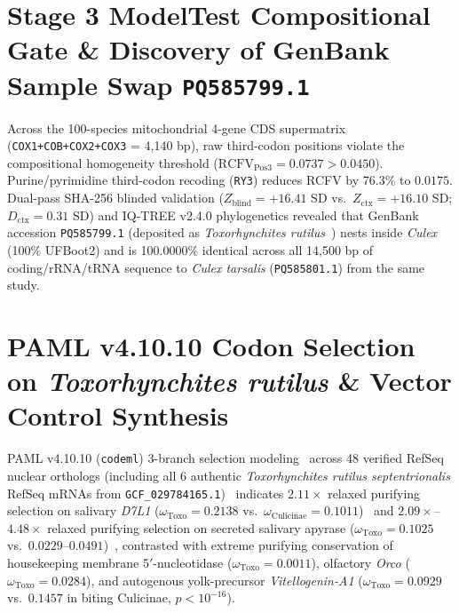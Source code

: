 \documentclass[10pt,letterpaper]{article}
\begin{document}
\section{Stage 3 ModelTest Compositional Gate \& Discovery of GenBank Sample Swap \texttt{PQ585799.1}}
Across the 100-species mitochondrial 4-gene CDS supermatrix (\texttt{COX1+COB+COX2+COX3} = 4,140 bp), raw third-codon positions violate the compositional homogeneity threshold ($\text{RCFV}_{\text{Pos3}} = 0.0737 > 0.0450$). Purine/pyrimidine third-codon recoding (\texttt{RY3}) reduces RCFV by 76.3\% to $0.0175$. Dual-pass SHA-256 blinded validation ($Z_{\text{blind}} = +16.41$ SD vs.\ $Z_{\text{ctx}} = +16.10$ SD; $D_{\text{ctx}} = 0.31$ SD) and IQ-TREE v2.4.0 phylogenetics revealed that GenBank accession \texttt{PQ585799.1} (deposited as \textit{Toxorhynchites rutilus}~\cite{Ali2025}) nests inside \textit{Culex} (100\% UFBoot2) and is 100.0000\% identical across all 14,500 bp of coding/rRNA/tRNA sequence to \textit{Culex tarsalis} (\texttt{PQ585801.1}) from the same study.

\section{PAML v4.10.10 Codon Selection on \textit{Toxorhynchites rutilus} \& Vector Control Synthesis}
PAML v4.10.10 (\texttt{codeml}) 3-branch selection modeling~\cite{Yang2007} across 48 verified RefSeq nuclear orthologs (including all 6 authentic \textit{Toxorhynchites rutilus septentrionalis} RefSeq mRNAs from \texttt{GCF\_029784165.1})~\cite{Donald2020} indicates $2.11\times$ relaxed purifying selection on salivary \textit{D7L1} ($\omega_{\text{Toxo}} = 0.2138$ vs.\ $\omega_{\text{Culicinae}} = 0.1011$)~\cite{Calvo2006,Mans2007} and $2.09\times$--$4.48\times$ relaxed purifying selection on secreted salivary apyrase ($\omega_{\text{Toxo}} = 0.1025$ vs.\ $0.0229$--$0.0491$)~\cite{Champagne1995}, contrasted with extreme purifying conservation of housekeeping membrane 5$'$-nucleotidase ($\omega_{\text{Toxo}} = 0.0011$), olfactory \textit{Orco} ($\omega_{\text{Toxo}} = 0.0284$), and autogenous yolk-precursor \textit{Vitellogenin-A1} ($\omega_{\text{Toxo}} = 0.0929$ vs.\ $0.1457$ in biting Culicinae, $p < 10^{-16}$).
\end{document}
